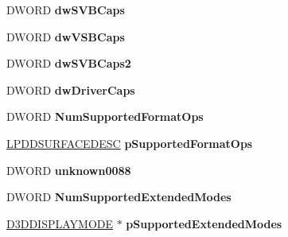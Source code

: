 \begin{DoxyCompactItemize}
\mbox{\label{struct___d3_d9___d_r_i_v_e_r_c_a_p_s_a3409316cc89806f88dc2b28a0f00fee4}} 
D\+W\+O\+RD {\bfseries dw\+S\+V\+B\+Caps}
\item 
\mbox{\label{struct___d3_d9___d_r_i_v_e_r_c_a_p_s_a4700c764670db9c33810cfc3486fdc97}} 
D\+W\+O\+RD {\bfseries dw\+V\+S\+B\+Caps}
\item 
\mbox{\label{struct___d3_d9___d_r_i_v_e_r_c_a_p_s_ac50718c5d3bfde8d3d0df4d395de2c70}} 
D\+W\+O\+RD {\bfseries dw\+S\+V\+B\+Caps2}
\item 
\mbox{\label{struct___d3_d9___d_r_i_v_e_r_c_a_p_s_a315936ba45bcb8a1a1aad2f47fac838e}} 
D\+W\+O\+RD {\bfseries dw\+Driver\+Caps}
\item 
\mbox{\label{struct___d3_d9___d_r_i_v_e_r_c_a_p_s_a8b3dd34cc7341619564de204a8552cff}} 
D\+W\+O\+RD {\bfseries Num\+Supported\+Format\+Ops}
\item 
\mbox{\label{struct___d3_d9___d_r_i_v_e_r_c_a_p_s_a772221294e8f3a6353410122af4f16d0}} 
\hyperlink{interfacevoid}{L\+P\+D\+D\+S\+U\+R\+F\+A\+C\+E\+D\+E\+SC} {\bfseries p\+Supported\+Format\+Ops}
\item 
\mbox{\label{struct___d3_d9___d_r_i_v_e_r_c_a_p_s_a466b6d5c5ab2c23144c6478e51f982bf}} 
D\+W\+O\+RD {\bfseries unknown0088}
\item 
\mbox{\label{struct___d3_d9___d_r_i_v_e_r_c_a_p_s_a96ab31665e8fbb2f6351c0832ba63eb2}} 
D\+W\+O\+RD {\bfseries Num\+Supported\+Extended\+Modes}
\item 
\mbox{\label{struct___d3_d9___d_r_i_v_e_r_c_a_p_s_a1d7356414c712c885212441e54e41c23}} 
\hyperlink{struct___d3_d_d_i_s_p_l_a_y_m_o_d_e}{D3\+D\+D\+I\+S\+P\+L\+A\+Y\+M\+O\+DE} $\ast$ {\bfseries p\+Supported\+Extended\+Modes}
\item 
\mbox{\label{struct___d3_d9___d_r_i_v_e_r_c_a_p_s_afb101f17355ae68e3bc17ac6a5ffbe2b}} 

\end{DoxyCompactItemize}

